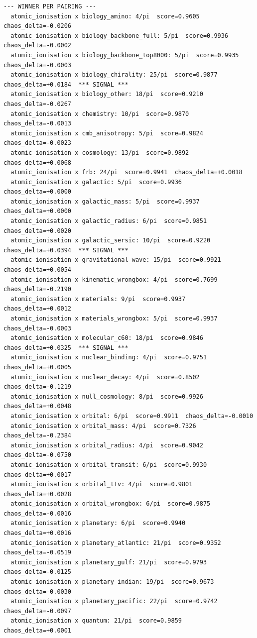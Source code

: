 \documentclass[11pt, letterpaper, openany]{book}
\begin{document}
\begin{empiricalbox}
\begin{lstlisting}[style=terminal]
--- WINNER PER PAIRING ---
  atomic_ionisation x biology_amino: 4/pi  score=0.9605  chaos_delta=-0.0206
  atomic_ionisation x biology_backbone_full: 5/pi  score=0.9936  chaos_delta=-0.0002
  atomic_ionisation x biology_backbone_top8000: 5/pi  score=0.9935  chaos_delta=-0.0003
  atomic_ionisation x biology_chirality: 25/pi  score=0.9877  chaos_delta=+0.0184  *** SIGNAL ***
  atomic_ionisation x biology_other: 18/pi  score=0.9210  chaos_delta=-0.0267
  atomic_ionisation x chemistry: 10/pi  score=0.9870  chaos_delta=-0.0013
  atomic_ionisation x cmb_anisotropy: 5/pi  score=0.9824  chaos_delta=-0.0023
  atomic_ionisation x cosmology: 13/pi  score=0.9892  chaos_delta=+0.0068
  atomic_ionisation x frb: 24/pi  score=0.9941  chaos_delta=+0.0018
  atomic_ionisation x galactic: 5/pi  score=0.9936  chaos_delta=+0.0000
  atomic_ionisation x galactic_mass: 5/pi  score=0.9937  chaos_delta=+0.0000
  atomic_ionisation x galactic_radius: 6/pi  score=0.9851  chaos_delta=+0.0020
  atomic_ionisation x galactic_sersic: 10/pi  score=0.9220  chaos_delta=+0.0394  *** SIGNAL ***
  atomic_ionisation x gravitational_wave: 15/pi  score=0.9921  chaos_delta=+0.0054
  atomic_ionisation x kinematic_wrongbox: 4/pi  score=0.7699  chaos_delta=-0.2190
  atomic_ionisation x materials: 9/pi  score=0.9937  chaos_delta=+0.0012
  atomic_ionisation x materials_wrongbox: 5/pi  score=0.9937  chaos_delta=-0.0003
  atomic_ionisation x molecular_c60: 18/pi  score=0.9846  chaos_delta=+0.0325  *** SIGNAL ***
  atomic_ionisation x nuclear_binding: 4/pi  score=0.9751  chaos_delta=+0.0005
  atomic_ionisation x nuclear_decay: 4/pi  score=0.8502  chaos_delta=-0.1219
  atomic_ionisation x null_cosmology: 8/pi  score=0.9926  chaos_delta=+0.0048
  atomic_ionisation x orbital: 6/pi  score=0.9911  chaos_delta=-0.0010
  atomic_ionisation x orbital_mass: 4/pi  score=0.7326  chaos_delta=-0.2384
  atomic_ionisation x orbital_radius: 4/pi  score=0.9042  chaos_delta=-0.0750
  atomic_ionisation x orbital_transit: 6/pi  score=0.9930  chaos_delta=+0.0017
  atomic_ionisation x orbital_ttv: 4/pi  score=0.9801  chaos_delta=+0.0028
  atomic_ionisation x orbital_wrongbox: 6/pi  score=0.9875  chaos_delta=-0.0016
  atomic_ionisation x planetary: 6/pi  score=0.9940  chaos_delta=+0.0016
  atomic_ionisation x planetary_atlantic: 21/pi  score=0.9352  chaos_delta=-0.0519
  atomic_ionisation x planetary_gulf: 21/pi  score=0.9793  chaos_delta=-0.0125
  atomic_ionisation x planetary_indian: 19/pi  score=0.9673  chaos_delta=-0.0030
  atomic_ionisation x planetary_pacific: 22/pi  score=0.9742  chaos_delta=-0.0097
  atomic_ionisation x quantum: 21/pi  score=0.9859  chaos_delta=+0.0001

\end{lstlisting}
\end{empiricalbox}
\end{document}
